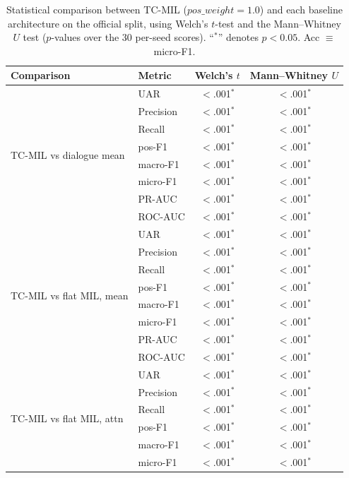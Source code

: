 \documentclass[conference]{IEEEtran}
\begin{document}
\begin{table}[t]
\caption{Statistical comparison between TC-MIL ($pos\_weight\!=\!1.0$) and each
baseline architecture on the official split, using Welch's $t$-test and the
Mann--Whitney $U$ test ($p$-values over the 30 per-seed scores). ``$^{*}$''
denotes $p<0.05$. Acc $\equiv$ micro-F1.}
\label{tab:stats}
\centering
\scriptsize
\setlength{\tabcolsep}{4pt}
\begin{tabular}{@{}llcc@{}}
\toprule
\textbf{Comparison} & \textbf{Metric} & \textbf{Welch's $t$} & \textbf{Mann--Whitney $U$} \\
\midrule
\multirow{8}{*}{TC-MIL vs dialogue mean} & UAR & $<$.001$^{*}$ & $<$.001$^{*}$ \\
 & Precision & $<$.001$^{*}$ & $<$.001$^{*}$ \\
 & Recall & $<$.001$^{*}$ & $<$.001$^{*}$ \\
 & pos-F1 & $<$.001$^{*}$ & $<$.001$^{*}$ \\
 & macro-F1 & $<$.001$^{*}$ & $<$.001$^{*}$ \\
 & micro-F1 & $<$.001$^{*}$ & $<$.001$^{*}$ \\
 & PR-AUC & $<$.001$^{*}$ & $<$.001$^{*}$ \\
 & ROC-AUC & $<$.001$^{*}$ & $<$.001$^{*}$ \\
\midrule
\multirow{8}{*}{TC-MIL vs flat MIL, mean} & UAR & $<$.001$^{*}$ & $<$.001$^{*}$ \\
 & Precision & $<$.001$^{*}$ & $<$.001$^{*}$ \\
 & Recall & $<$.001$^{*}$ & $<$.001$^{*}$ \\
 & pos-F1 & $<$.001$^{*}$ & $<$.001$^{*}$ \\
 & macro-F1 & $<$.001$^{*}$ & $<$.001$^{*}$ \\
 & micro-F1 & $<$.001$^{*}$ & $<$.001$^{*}$ \\
 & PR-AUC & $<$.001$^{*}$ & $<$.001$^{*}$ \\
 & ROC-AUC & $<$.001$^{*}$ & $<$.001$^{*}$ \\
\midrule
\multirow{8}{*}{TC-MIL vs flat MIL, attn} & UAR & $<$.001$^{*}$ & $<$.001$^{*}$ \\
 & Precision & $<$.001$^{*}$ & $<$.001$^{*}$ \\
 & Recall & $<$.001$^{*}$ & $<$.001$^{*}$ \\
 & pos-F1 & $<$.001$^{*}$ & $<$.001$^{*}$ \\
 & macro-F1 & $<$.001$^{*}$ & $<$.001$^{*}$ \\
 & micro-F1 & $<$.001$^{*}$ & $<$.001$^{*}$ \\

\end{tabular}
\end{table}
\end{document}
